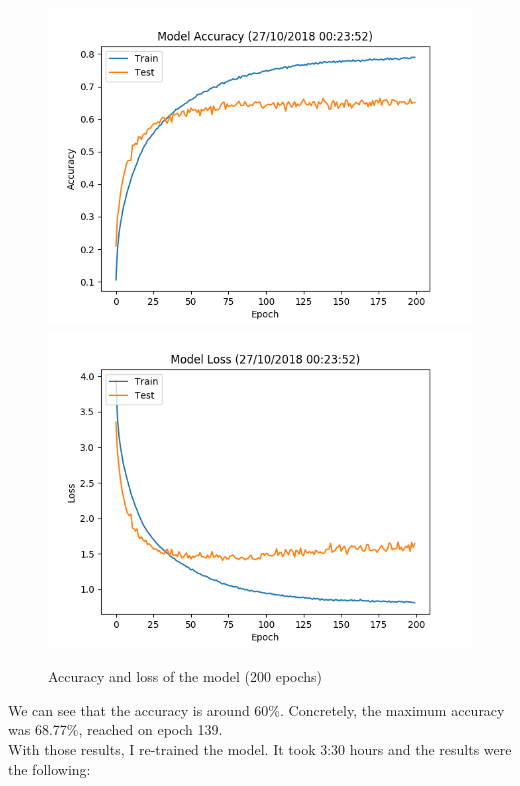 \documentclass[12pt,english]{article}
\begin{document}
\begin{figure}[H]
\centering
\includegraphics[scale=0.85]{accuracy.png}
\includegraphics[scale=0.85]{loss.png}
\caption{Accuracy and loss of the model (200 epochs)}
\end{figure}

We can see that the accuracy is around 60\%. Concretely, the maximum accuracy was 68.77\%, reached on epoch 139.\\

With those results, I re-trained the model. It took 3:30 hours and the results were the following:
\end{document}

